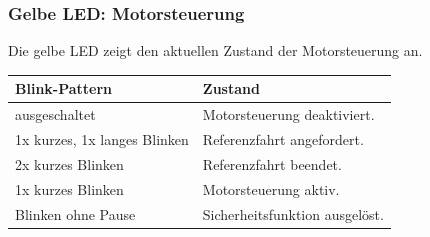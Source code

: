         \subsubsection{Gelbe LED: Motorsteuerung}
        Die gelbe LED zeigt den aktuellen Zustand der Motorsteuerung an.
        \begin{table}[H]
            \centering
            \begin{tabular}{|l|l|}
                \hline
                \textbf{Blink-Pattern}  & \textbf{Zustand}  \\
                \hline
                ausgeschaltet           & Motorsteuerung deaktiviert. \\
                1x kurzes, 1x langes Blinken & Referenzfahrt angefordert.\\
                2x kurzes Blinken       & Referenzfahrt beendet.\\
                1x kurzes Blinken       & Motorsteuerung aktiv.\\
                Blinken ohne Pause      & Sicherheitsfunktion ausgelöst.\\
                \hline
            \end{tabular}
        \end{table}